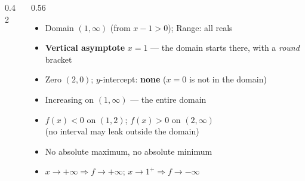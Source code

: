 \documentclass[aspectratio=169, 11pt]{beamer}
\newcommand{\lgrid}[4]{%
  \draw[step=1, linegray!45, thin] (#1,#3) grid (#2,#4);
  \draw[->, thick, charcoal] (#1,0)--(#2,0) node[below right, font=\tiny]{$x$};
  \draw[->, thick, charcoal] (0,#3)--(0,#4) node[left, font=\tiny]{$y$};}
\newcommand{\logcurve}[5]{\draw[very thick, forest, domain=#4:#5, samples=120, smooth]
  plot ({pow(#1,\x-(#3))+(#2)},{\x});}
\begin{document}
\begin{frame}[t, plain]
  \begin{columns}[T]
    \begin{column}{0.42\textwidth}
      \centering
    \end{column}
    \begin{column}{0.56\textwidth}
      \footnotesize
      \begin{itemize}\setlength{\itemsep}{3pt}
        \item Domain $(1,\infty)$ \; (from $x-1>0$); \; Range: all reals
        \item \textbf{Vertical asymptote} $x=1$ --- the domain starts there, with a \emph{round}
              bracket
        \item Zero $(2,0)$; \; $y$-intercept: \textbf{none} ($x=0$ is not in the domain)
        \item Increasing on $(1,\infty)$ --- the entire domain
        \item $f(x)<0$ on $(1,2)$; \; $f(x)>0$ on $(2,\infty)$ \\
              {\scriptsize (no interval may leak outside the domain)}
        \item No absolute maximum, no absolute minimum
        \item $x\to+\infty \Rightarrow f\to+\infty$; \; $x\to 1^{+} \Rightarrow f\to-\infty$
      \end{itemize}
    \end{column}
  \end{columns}
\end{frame}
\end{document}
